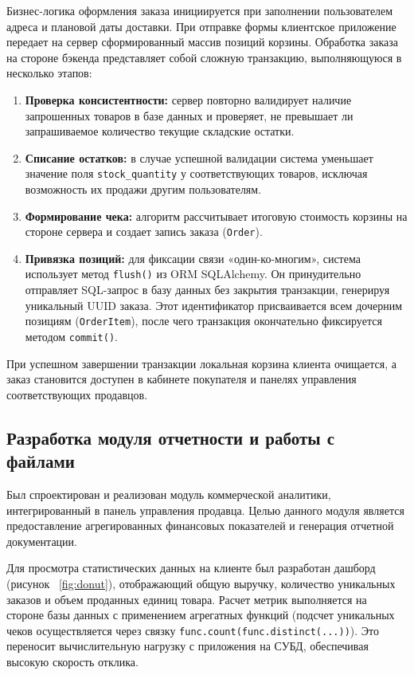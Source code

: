 Бизнес-логика оформления заказа инициируется при заполнении пользователем адреса и плановой даты доставки. При отправке формы клиентское приложение передает на сервер 
сформированный массив позиций корзины. Обработка заказа на стороне бэкенда представляет собой сложную транзакцию, выполняющуюся в несколько этапов:
\begin{enumerate}
    \item \textbf{Проверка консистентности:} сервер повторно валидирует наличие запрошенных товаров в базе данных и проверяет, не превышает ли запрашиваемое количество текущие 
	складские остатки.
    \item \textbf{Списание остатков:} в случае успешной валидации система уменьшает значение поля \texttt{stock\_quantity} у соответствующих товаров, исключая 
	возможность их продажи другим пользователям.
    \item \textbf{Формирование чека:} алгоритм рассчитывает итоговую стоимость корзины на стороне сервера и создает запись заказа (\texttt{Order}).
    \item \textbf{Привязка позиций:} для фиксации связи «один-ко-многим», система использует метод \texttt{flush()} из ORM SQLAlchemy. Он принудительно отправляет 
	SQL-запрос в базу данных без закрытия транзакции, генерируя уникальный UUID заказа. Этот идентификатор присваивается всем дочерним позициям (\texttt{OrderItem}), после чего 
	транзакция окончательно фиксируется методом \texttt{commit()}.
\end{enumerate}

При успешном завершении транзакции локальная корзина клиента очищается, а заказ становится доступен в кабинете покупателя и панелях управления соответствующих продавцов.

\subsection{Разработка модуля отчетности и работы с файлами}

Был спроектирован и реализован модуль коммерческой аналитики, интегрированный в панель управления продавца. Целью данного модуля является предоставление агрегированных 
финансовых показателей и генерация отчетной документации.

Для просмотра статистических данных на клиенте был разработан дашборд (рисунок ~\ref{fig:donut}), отображающий общую выручку, количество уникальных заказов и объем проданных 
единиц товара. Расчет метрик выполняется на стороне базы данных с применением агрегатных функций (подсчет уникальных чеков осуществляется через 
связку \texttt{func.count(func.distinct(...))}). Это переносит вычислительную нагрузку с приложения на СУБД, обеспечивая высокую скорость отклика.

